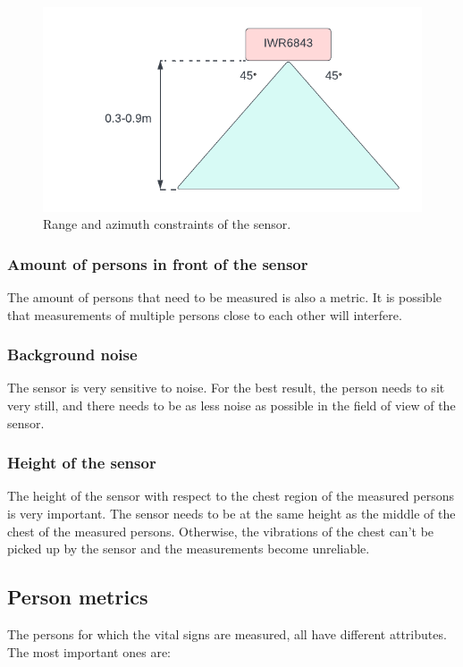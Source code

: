 \begin{figure}[t]
    \centering
    \includegraphics[width=.6\textwidth]{figures/validation/range_metric.pdf}
    \caption{Range and azimuth constraints of the sensor.}
    \label{fig:range_metric}
\end{figure}

\subsubsection{Amount of persons in front of the sensor}
The amount of persons that need to be measured is also a metric. It is possible that measurements of multiple persons close to each other will interfere.

\subsubsection{Background noise}
The sensor is very sensitive to noise. For the best result, the person needs to sit very still, and there needs to be as less noise as possible in the field of view of the sensor.

\subsubsection{Height of the sensor}
The height of the sensor with respect to the chest region of the measured persons is very important. The sensor needs to be at the same height as the middle of the chest of the measured persons. Otherwise, the vibrations of the chest can't be picked up by the sensor and the measurements become unreliable.

\subsection{Person metrics}
\label{sec:person_metrics}
The persons for which the vital signs are measured, all have different attributes. The most important ones are:

